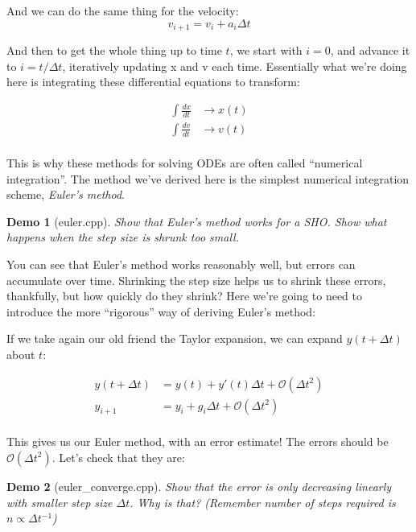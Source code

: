 \documentclass{article}
\theoremstyle{demo}
\newtheorem{demo}{Demo}[section]
\begin{document}
And we can do the same thing for the velocity:
\begin{equation}
    v_{i+1} = v_i + a_i \Delta t
\end{equation}

And then to get the whole thing up to time $t$, we start with $i=0$, and advance
it to $i=t/\Delta t$, iteratively updating x and v each time.  Essentially what
we're doing here is integrating these differential equations to transform:

\begin{equation}
    \begin{aligned}
        \int \frac{dx}{dt} &\rightarrow x(t) \\
        \int \frac{dv}{dt} &\rightarrow v(t) \\
    \end{aligned}
\end{equation}

This is why these methods for solving ODEs are often called ``numerical
integration''.  The method we've derived here is the simplest numerical
integration scheme, \textit{Euler's method}.

\begin{demo}[euler.cpp]
    Show that Euler's method works for a SHO.  Show what happens when the step
    size is shrunk too small.
\end{demo}

You can see that Euler's method works reasonably well, but errors can accumulate
over time.  Shrinking the step size helps us to shrink these errors, thankfully,
but how quickly do they shrink?  Here we're going to need to introduce the more
``rigorous'' way of deriving Euler's method:

If we take again our old friend the Taylor expansion, we can expand $y(t+\Delta
t)$ about $t$:

\begin{equation}
    \begin{aligned}
        y(t+\Delta t) &= y(t) + y'(t)\Delta t + \mathcal{O}(\Delta t^2)\\
        y_{i+1} &= y_i + g_{i}\Delta t + \mathcal{O}(\Delta t^2)\\
    \end{aligned}
\end{equation}

This gives us our Euler method, with an error estimate!  The errors should be
$\mathcal{O}(\Delta t^2)$.  Let's check that they are:

\begin{demo}[euler\_converge.cpp]
    Show that the error is only decreasing linearly with smaller step size
    $\Delta t$.  Why is that?  (Remember number of steps required is $n\propto
    \Delta t^{-1}$)
\end{demo}
\end{document}
